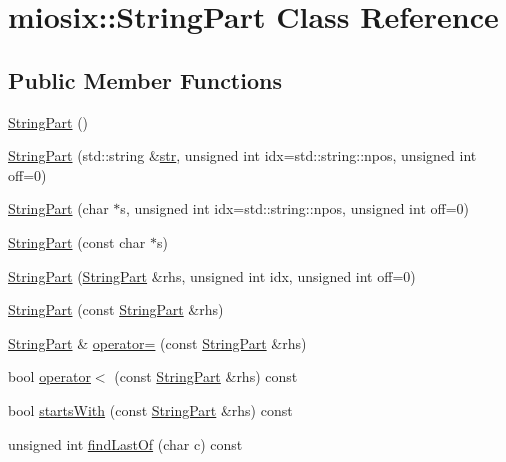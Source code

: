 \hypertarget{classmiosix_1_1_string_part}{\section{miosix\-:\-:String\-Part Class Reference}
\label{classmiosix_1_1_string_part}
}
\subsection*{Public Member Functions}
\begin{DoxyCompactItemize}
\item 
\hyperlink{classmiosix_1_1_string_part_a467c71b395ace21c939e71494063dc3e}{String\-Part} ()
\item 
\hyperlink{classmiosix_1_1_string_part_abc7455dcf4c627e4ce530ba982e7b314}{String\-Part} (std\-::string \&\hyperlink{classmiosix_1_1_string_part_ae726e5874d5bbdb6aca5111a8b73e620}{str}, unsigned int idx=std\-::string\-::npos, unsigned int off=0)
\item 
\hyperlink{classmiosix_1_1_string_part_a516436d0b0910c4e5959586d63ea7dc2}{String\-Part} (char $\ast$s, unsigned int idx=std\-::string\-::npos, unsigned int off=0)
\item 
\hyperlink{classmiosix_1_1_string_part_a1bc55fffc94510932dc46b942f8b7859}{String\-Part} (const char $\ast$s)
\item 
\hyperlink{classmiosix_1_1_string_part_a523d75598b4bf437c0a29e2cc4261eba}{String\-Part} (\hyperlink{classmiosix_1_1_string_part}{String\-Part} \&rhs, unsigned int idx, unsigned int off=0)
\item 
\hyperlink{classmiosix_1_1_string_part_a01b70b1877be9846a64e54924c8dde60}{String\-Part} (const \hyperlink{classmiosix_1_1_string_part}{String\-Part} \&rhs)
\item 
\hyperlink{classmiosix_1_1_string_part}{String\-Part} \& \hyperlink{classmiosix_1_1_string_part_a4c859bf24470a3a94241dd929354450b}{operator=} (const \hyperlink{classmiosix_1_1_string_part}{String\-Part} \&rhs)
\item 
bool \hyperlink{classmiosix_1_1_string_part_abe703fcc4db35b28e63bcb66870d2334}{operator$<$} (const \hyperlink{classmiosix_1_1_string_part}{String\-Part} \&rhs) const 
\item 
bool \hyperlink{classmiosix_1_1_string_part_a9fac47e3cdf561377162ea4a4674e034}{starts\-With} (const \hyperlink{classmiosix_1_1_string_part}{String\-Part} \&rhs) const 
\item 
unsigned int \hyperlink{classmiosix_1_1_string_part_a5b43ad4108cfb42518165ed477b6652a}{find\-Last\-Of} (char c) const 

\end{DoxyCompactItemize}
